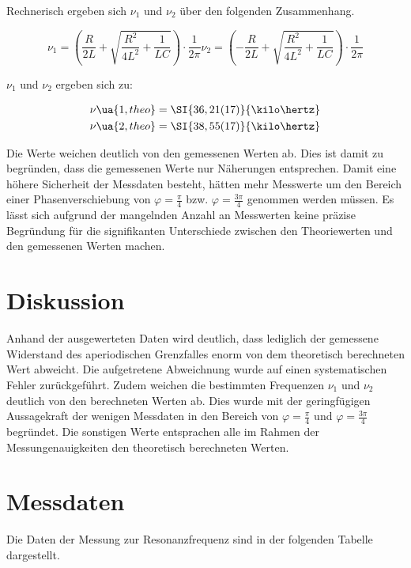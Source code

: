 Rechnerisch ergeben sich $\nu_1$ und $\nu_2$ über den folgenden Zusammenhang.

\begin{equation}
  \nu_1 = (\frac{R}{2L} + \sqrt{\frac{R^2}{4L^2} + \frac{1}{LC}})\cdot \frac{1}{2\pi}
  \nu_2 = (-\frac{R}{2L} + \sqrt{\frac{R^2}{4L^2} + \frac{1}{LC}})\cdot \frac{1}{2\pi}
\end{equation}

$\nu_1$ und $\nu_2$ ergeben sich zu:

\begin{align*}
  \nu\ua{1,theo} &= \SI{36,21(17)}{\kilo\hertz} \\
  \nu\ua{2,theo} &= \SI{38,55(17)}{\kilo\hertz}
\end{align*}

Die Werte weichen deutlich von den gemessenen Werten ab.
Dies ist damit zu begründen, dass die gemessenen Werte nur Näherungen entsprechen.
Damit eine höhere Sicherheit der Messdaten besteht, hätten mehr Messwerte um den
Bereich einer Phasenverschiebung von $\varphi = \frac{\pi}{4}$ bzw.
$\varphi = \frac{3\pi}{4}$ genommen werden müssen. Es lässt sich aufgrund der
mangelnden Anzahl an Messwerten keine präzise Begründung für die signifikanten Unterschiede
zwischen den Theoriewerten und den gemessenen Werten machen.

\section{Diskussion}

Anhand der ausgewerteten Daten wird deutlich, dass lediglich der gemessene
Widerstand des aperiodischen Grenzfalles enorm von dem theoretisch berechneten Wert
abweicht.
Die aufgetretene Abweichnung wurde auf einen systematischen Fehler zurückgeführt.
Zudem weichen die bestimmten Frequenzen $\nu_1$ und $\nu_2$ deutlich von den
berechneten Werten ab. Dies wurde mit der geringfügigen Aussagekraft der wenigen
Messdaten in den Bereich von $\varphi = \frac{\pi}{4}$ und $\varphi = \frac{3\pi}{4}$
begründet.
Die sonstigen Werte entsprachen alle im Rahmen der Messungenauigkeiten den theoretisch
berechneten Werten.

\section{Messdaten}

Die Daten der Messung zur Resonanzfrequenz sind in der folgenden Tabelle dargestellt.

